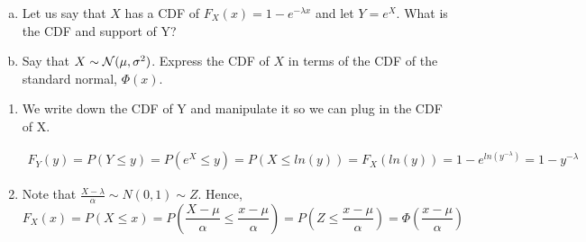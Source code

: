 \documentclass[11pt]{article}
\begin{document}
\pagebreak

\begin{exercise}
\begin{enumerate}[a)] \itemsep 1.8in
\item Let us say that $X$ has a CDF of $F_X(x) = 1 - e^{-\lambda x}$ and let $Y = e^X$. What is the CDF and support of Y?
\item Say that $X \sim \mathcal{N}(\mu, \sigma^2)$. Express the CDF of $X$ in terms of the CDF of the standard normal, $\Phi(x)$.
\end{enumerate}
\end{exercise}
\begin{solution}
\begin{enumerate}
\item We write down the CDF of Y and manipulate it so we can plug in the CDF of X.

\begin{align*}
F_Y(y) = P(Y \le y) = P(e^X \le y) = P(X \le ln(y)) = F_X(ln(y)) = 1 - e^{ln(y^{-\lambda})} = 1 - y^{-\lambda}
\end{align*}

\item Note that $\frac{X-\lambda}{\alpha} \sim N(0,1) \sim Z$. Hence,
$$F_X(x) = P(X \le x) = P(\frac{X-\mu}{\alpha} \le \frac{x-\mu}{\alpha}) = P(Z \le \frac{x-\mu}{\alpha}) = \Phi(\frac{x-\mu}{\alpha})$$

\end{enumerate}
\end{solution}
\end{document}
